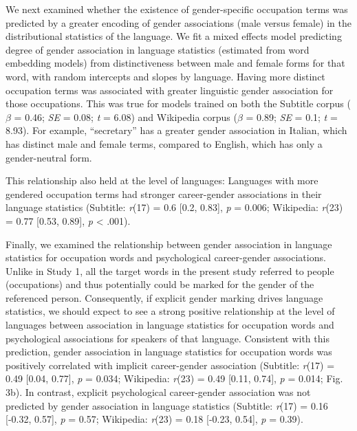 \documentclass[11pt]{wlscirep}
\begin{document}
We next examined whether the existence of gender-specific occupation terms was predicted by a greater encoding of gender associations (male versus female) in the distributional statistics of the language. We fit a mixed effects model predicting degree of gender association in language statistics (estimated from word embedding models) from distinctiveness between male and female forms for that word, with random intercepts and slopes by language. Having more distinct occupation terms was associated with greater linguistic gender association for those occupations. This was true for models trained on both the Subtitle corpus (\(\beta\) = 0.46; \emph{SE} = 0.08; \emph{t} = 6.08) and Wikipedia
corpus (\(\beta\) = 0.89; \emph{SE} = 0.1; \emph{t} = 8.93). For example, \enquote{secretary} has a greater gender association in Italian, which has distinct male and female terms, compared to English, which has only a gender-neutral form. 

This relationship also held at the level of languages: Languages with more
gendered occupation terms had stronger career-gender associations in their language statistics
(Subtitle: \emph{r}(17) = 0.6 {[}0.2, 0.83{]}, \emph{p} = 0.006; Wikipedia: \emph{r}(23) = 0.77 {[}0.53, 0.89{]}, \emph{p} \textless{} .001).

Finally, we examined the relationship between gender association in language
statistics for occupation words and psychological career-gender associations. Unlike in Study 1, all the target words in the present study referred to
people (occupations) and thus potentially could be marked for the gender
of the referenced person. Consequently, if explicit gender marking
drives language statistics, we should expect to see a strong positive
relationship at the level of languages between association in language
statistics for occupation words and psychological associations for
speakers of that language. Consistent with this prediction, gender association
in language statistics for occupation words was positively correlated
with implicit career-gender association (Subtitle: \emph{r}(17) = 0.49 {[}0.04, 0.77{]}, \emph{p} = 0.034; Wikipedia: \emph{r}(23) = 0.49 {[}0.11, 0.74{]}, \emph{p} = 0.014; Fig. 3b). In contrast,  explicit psychological career-gender association was not predicted by gender association in language statistics (Subtitle: \emph{r}(17) = 0.16 {[}-0.32, 0.57{]}, \emph{p} = 0.57; Wikipedia: \emph{r}(23) = 0.18 {[}-0.23, 0.54{]}, \emph{p} = 0.39).
\end{document}
